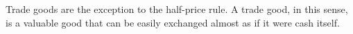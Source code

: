 Trade goods are the exception to the half-price rule. A trade good, in this sense, is a valuable good that can be easily exchanged almost as if it were cash itself.







